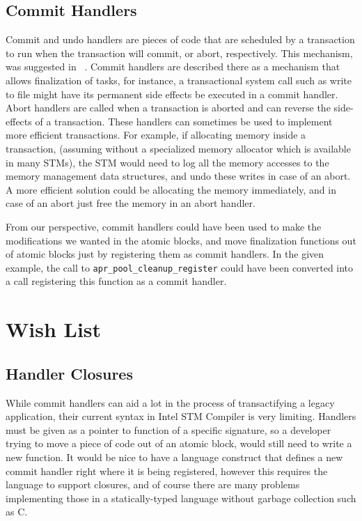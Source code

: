 \documentclass[preprint,natbib,11pt]{sigplanconf}
\begin{document}
\subsection{Commit Handlers}
Commit and undo handlers are pieces of code that are scheduled by a transaction
to run when the transaction will commit, or abort, respectively. This mechanism,
was suggested in ~\cite{tm:commit-handlers}.  Commit handlers are described
there as a mechanism that allows finalization of tasks, for instance, a
transactional system call such as write to file might have its permanent side
effects be executed in a commit handler. 
Abort handlers are called when a transaction is aborted and can reverse the 
side-effects of a transaction. These handlers can sometimes be used to implement
more efficient transactions. For example, if allocating memory inside a
transaction, (assuming without a specialized memory allocator which is available
in many STMs), the STM would need to log all the memory accesses to the memory
management data structures, and undo these writes in case of an abort. A more
efficient solution could be allocating the memory immediately, and in case of an
abort just free the memory in an abort handler.

From our perspective, commit handlers could have been used to make the
modifications we wanted in the atomic blocks, and move finalization functions
out of atomic blocks just by registering them as commit handlers. In the given
example, the call to {\tt apr\_pool\_cleanup\_register} could have been
converted into a call registering this function as a commit handler.

\section{Wish List}
\subsection{Handler Closures}
While commit handlers can aid a lot in the process of transactifying a legacy
application, their current syntax in Intel STM Compiler is very limiting.
Handlers must be given as a pointer to function of a specific signature, so a
developer trying to move a piece of code out of an atomic block, would still
need to write a new function. It would be nice to have a language construct that
defines a new commit handler right where it is being registered, however this
requires the language to support closures, and of course there are many problems
implementing those in a statically-typed language without garbage collection
such as C.
\end{document}
